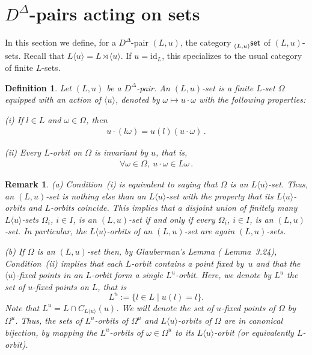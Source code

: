 \documentclass[11pt]{article}
\theoremstyle{change}  %
\newtheorem{remark}[theorem]{Remark}
\newtheorem{definition}[theorem]{Definition}
\newcommand{\catfont}{\mathsf}
\newcommand{\id}{\mathrm{id}}
\newcommand{\lset}[1]{\llap{\phantom{|}}_{#1}\catfont{set}}
\newcommand{\DD}{D^{\Delta}}
\def\Lu{L\langle u\rangle}
\newcommand{\pset}[1]{\lset{#1}}
\begin{document}

\section{$\DD$-pairs acting on sets}

In this section we define, for a $\DD$-pair $(L,u)$, the category
$\pset{(L,u)}$ of $(L,u)$-sets. Recall that $L\langle u\rangle=L\rtimes \langle u\rangle$. If $u=\id_L$, this specializes to the usual category of finite $L$-sets.

\begin{definition}\label{def (L,u)-set}
	Let $(L,u)$ be a $\DD$-pair. An \emph{$(L,u)$-set} is a finite $L$-set $\Omega$ equipped with an action of $\langle u\rangle$, denoted by $\omega\mapsto u\cdot \omega$ with the following properties:
	
	\smallskip
	{\rm (i)} If $l\in L$ and $\omega\in \Omega$, then
		\begin{align*}
			u\cdot (l\omega)=u(l)(u\cdot \omega)\,.
		\end{align*}
		
	\smallskip
	{\rm (ii)} Every $L$-orbit on $\Omega$ is invariant by $u$, that is,
		\begin{align*}
			\forall \omega\in \Omega,\ u\cdot \omega\in L\omega\,.
		\end{align*}  
\end{definition}


\begin{remark}\label{rem (L,u)-sets}
(a) Condition~{\rm (i)} is equivalent to saying that $\Omega$ is an $\Lu$-set. Thus, an $(L,u)$-set is nothing else than an $\Lu$-set with the property that its $\Lu$-orbits and $L$-orbits coincide. This implies that a disjoint union of finitely many $\Lu$-sets $\Omega_i$, $i\in I$, is an $(L,u)$-set if and only if every $\Omega_i$, $i\in I$, is an $(L,u)$-set. In particular, the $\Lu$-orbits of an $(L,u)$-set are again $(L,u)$-sets.

\smallskip
(b) If $\Omega$ is an $(L,u)$-set then, by Glauberman's Lemma (\cite{Isaacs} Lemma~3.24),
Condition~(ii) implies that each $L$-orbit contains a point fixed by~$u$ and that the $\langle u\rangle$-fixed points in an $L$-orbit form a single $L^u$-orbit. Here, we denote by $L^u$ the set of $u$-fixed points on $L$, that is 
$$L^u:=\{l\in L\mid u(l)=l\}.$$
Note that $L^u=L\cap C_{\Lu}(u)$. We will denote the set of $u$-fixed points of $\Omega$ by $\Omega^u$. Thus, the sets of $L^u$-orbits of $\Omega^u$ and $\Lu$-orbits of $\Omega$ are in canonical bijection, by mapping the $L^u$-orbits of $\omega\in \Omega^u$ to its $\Lu$-orbit (or equivalently $L$-orbit).
\end{remark}
\end{document}
